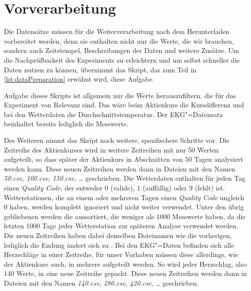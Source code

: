 \section{Vorverarbeitung}
Die Datensätze müssen für die Weiterverarbeitung nach dem Herunterladen vorbereitet werden, denn sie enthalten nicht nur die Werte, die wir brauchen, sondern auch Zeitstempel, Beschreibungen der Daten und weitere Zusätze. Um die Nachprüfbarkeit des Experiments zu erleichtern und um selbst schneller die Daten nutzen zu können, übernimmt das Skript, das zum Teil in \autoref{lst:dataPreparation} erwähnt wird, diese Aufgabe.

Aufgabe dieses Skripts ist allgemein nur die Werte herauszufiltern, die für das Experiment von Relevanz sind. Das wäre beim Aktienkurs die Kursdifferenz und bei den Wetterdaten die Durchschnittstemperatur. Der EKG"=Datensatz beinhaltet bereits lediglich die Messwerte. 

Des Weiteren nimmt das Skript noch weitere, spezifischere Schritte vor. Die Zeitreihe des Aktienkurses wird in weitere Zeitreihen mit nur 50 Werten aufgeteilt, so dass später der Aktienkurs in Abschnitten von 50 Tagen analysiert werden kann. Diese neuen Zeitreihen werden dann in Dateien mit den Namen \textit{50.csv, 100.csv, 150.csv, \dots} geschrieben. Die Wetterdaten enthalten für jeden Tag einen \textit{Quality Code}, der entweder 0 (valide), 1 (auffällig) oder 9 (fehlt) ist. Wetterstationen, die an einem oder mehreren Tagen einen \textit{Quality Code} ungleich 0 haben, werden komplett ignoriert und nicht weiter verwendet. Unter den übrig gebliebenen werden die aussortiert, die weniger als 1000 Messwerte haben, da die letzten 1000 Tage jeder Wetterstation zur späteren Analyse verwendet werden. Die neuen Zeitreihen haben dabei denselben Dateinamen wie die vorherigen, lediglich die Endung ändert sich zu . Bei den EKG"=Daten befinden sich alle Herzschläge in einer Zeitreihe, für unser Vorhaben müssen diese allerdings, wie der Aktienkurs auch, in mehrere aufgeteilt werden. So wird jeder Herzschlag, also 140 Werte, in eine neue Zeitreihe gepackt. Diese neuen Zeitreihen werden dann in Dateien mit den Namen \textit{140.csv, 280.csv, 420.csv, \dots} geschrieben.
